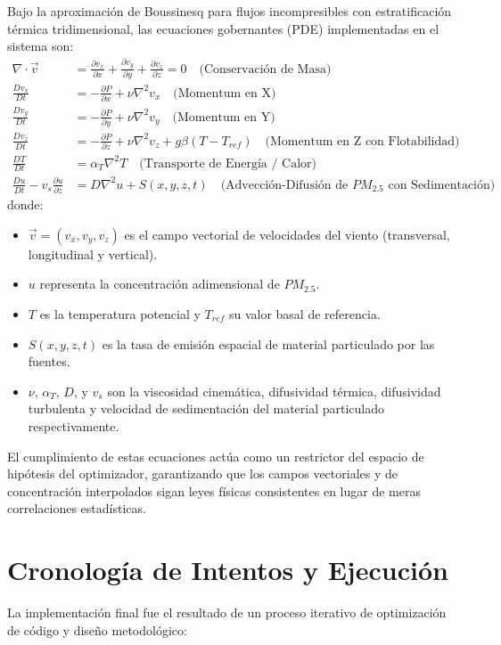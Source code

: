 \documentclass[11pt,letterpaper]{article}
\begin{document}
Bajo la aproximación de Boussinesq para flujos incompresibles con estratificación térmica tridimensional, las ecuaciones gobernantes (PDE) implementadas en el sistema son:
\begin{align}
\nabla \cdot \vec{v} &= \frac{\partial v_x}{\partial x} + \frac{\partial v_y}{\partial y} + \frac{\partial v_z}{\partial z} = 0 \quad \text{(Conservación de Masa)} \\
\frac{D v_x}{D t} &= -\frac{\partial P}{\partial x} + \nu \nabla^2 v_x \quad \text{(Momentum en X)} \\
\frac{D v_y}{D t} &= -\frac{\partial P}{\partial y} + \nu \nabla^2 v_y \quad \text{(Momentum en Y)} \\
\frac{D v_z}{D t} &= -\frac{\partial P}{\partial z} + \nu \nabla^2 v_z + g\beta(T - T_{ref}) \quad \text{(Momentum en Z con Flotabilidad)} \\
\frac{D T}{D t} &= \alpha_T \nabla^2 T \quad \text{(Transporte de Energía / Calor)} \\
\frac{D u}{D t} - v_s \frac{\partial u}{\partial z} &= D \nabla^2 u + S(x, y, z, t) \quad \text{(Advección-Difusión de } PM_{2.5} \text{ con Sedimentación)}
\end{align}
donde:
\begin{itemize}
    \item $\vec{v} = (v_x, v_y, v_z)$ es el campo vectorial de velocidades del viento (transversal, longitudinal y vertical).
    \item $u$ representa la concentración adimensional de $PM_{2.5}$.
    \item $T$ es la temperatura potencial y $T_{ref}$ su valor basal de referencia.
    \item $S(x, y, z, t)$ es la tasa de emisión espacial de material particulado por las fuentes.
    \item $\nu$, $\alpha_T$, $D$, y $v_s$ son la viscosidad cinemática, difusividad térmica, difusividad turbulenta y velocidad de sedimentación del material particulado respectivamente.
\end{itemize}

El cumplimiento de estas ecuaciones actúa como un restrictor del espacio de hipótesis del optimizador, garantizando que los campos vectoriales y de concentración interpolados sigan leyes físicas consistentes en lugar de meras correlaciones estadísticas.

\section{Cronología de Intentos y Ejecución}
La implementación final fue el resultado de un proceso iterativo de optimización de código y diseño metodológico:
\end{document}
